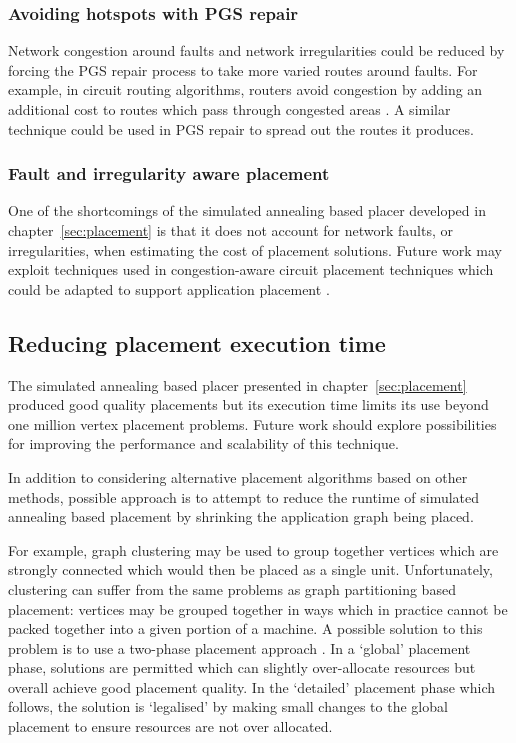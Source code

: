 			\subsubsection{Avoiding hotspots with PGS repair}
				
				\label{sec:pgs-repair-improvements}	
				
				Network congestion around faults and network irregularities could be
				reduced by forcing the PGS repair process to take more varied routes
				around faults. For example, in circuit routing algorithms, routers
				avoid congestion by adding an additional cost to routes which pass
				through congested areas \cite{kahng11}. A similar technique could be
				used in PGS repair to spread out the routes it produces.
			
			\subsubsection{Fault and irregularity aware placement}
				
				One of the shortcomings of the simulated annealing based placer
				developed in chapter~\ref{sec:placement} is that it does not account
				for network faults, or irregularities, when estimating the cost of
				placement solutions.  Future work may exploit techniques used in
				congestion-aware circuit placement techniques which could be adapted to
				support application placement \cite{viswanathan07}.
		
		\subsection{Reducing placement execution time}
			
			The simulated annealing based placer presented in
			chapter~\ref{sec:placement} produced good quality placements but its
			execution time limits its use beyond one million vertex placement
			problems. Future work should explore possibilities for improving the
			performance and scalability of this technique.
			
			In addition to considering alternative placement algorithms based on
			other methods, possible approach is to attempt to reduce the runtime of
			simulated annealing based placement by shrinking the application graph
			being placed.
			
			For example, graph clustering \cite{schaeffer07} may be used to group
			together vertices which are strongly connected which would then be placed
			as a single unit.  Unfortunately, clustering can suffer from the same
			problems as graph partitioning based placement: vertices may be grouped
			together in ways which in practice cannot be packed together into a given
			portion of a machine.  A possible solution to this problem is to use a
			two-phase placement approach \cite{kahng11}. In a `global' placement
			phase, solutions are permitted which can slightly over-allocate resources
			but overall achieve good placement quality. In the `detailed' placement
			phase which follows, the solution is `legalised' by making small changes
			to the global placement to ensure resources are not over allocated.
			
